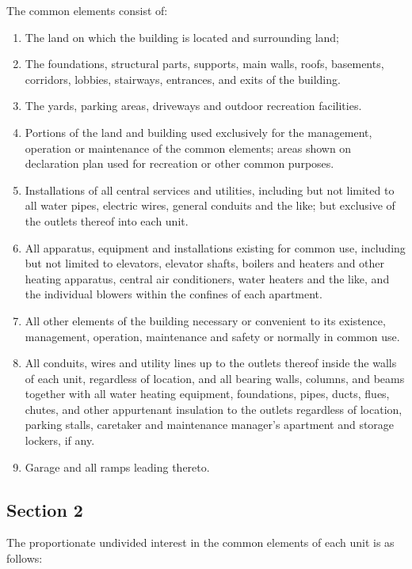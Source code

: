 \documentclass[
  14pt,
]{book}
\begin{document}
The common elements consist of:

\begin{enumerate}
\def\labelenumi{(\alph{enumi})}
\item
  The land on which the building is located and surrounding land;
\item
  The foundations, structural parts, supports, main walls, roofs, basements, corridors, lobbies, stairways, entrances, and exits of the building.
\item
  The yards, parking areas, driveways and outdoor recreation facilities.
\item
  Portions of the land and building used exclusively for the management, operation or maintenance of the common elements; areas shown on declaration plan used for recreation or other common purposes.
\item
  Installations of all central services and utilities, including but not limited to all water pipes, electric wires, general conduits and the like; but exclusive of the outlets thereof into each unit.
\item
  All apparatus, equipment and installations existing for common use, including but not limited to elevators, elevator shafts, boilers and heaters and other heating apparatus, central air conditioners, water heaters and the like, and the individual blowers within the confines of each apartment.
\item
  All other elements of the building necessary or convenient to its existence, management, operation, maintenance and safety or normally in common use.
\item
  All conduits, wires and utility lines up to the outlets thereof inside the walls of each unit, regardless of location, and all bearing walls, columns, and beams together with all water heating equipment, foundations, pipes, ducts, flues, chutes, and other appurtenant insulation to the outlets regardless of location, parking stalls, caretaker and maintenance manager's apartment and storage lockers, if any.
\item
  Garage and all ramps leading thereto.
\end{enumerate}

\hypertarget{section-2-1}{%
\subsection*{Section 2}\label{section-2-1}}

The proportionate undivided interest in the common elements of each unit is as follows:
\end{document}
